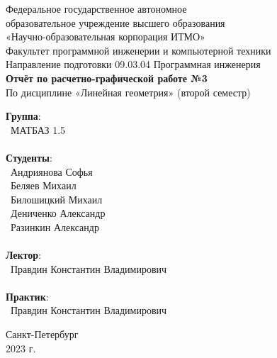 \documentclass{article}
\begin{document}
\thispagestyle{empty}
\begin{center}
        \Large
        Федеральное государственное автономное \\
        образовательное учреждение высшего образования \\ 
        «Научно-образовательная корпорация ИТМО»\\
        \vspace{0.5cm}
        \large
        Факультет программной инженерии и компьютерной техники \\
        Направление подготовки 09.03.04 Программная инженерия \\
        \vspace{1cm}
        \Large
        \textbf{Отчёт по расчетно-графической работе №3} \\
        По дисциплине «Линейная геометрия» (второй семестр)\\
        \large
        \vspace{8cm}
    
        \begin{minipage}{.33\textwidth}
        \end{minipage}
        \hfill
        \begin{minipage}{.4\textwidth}
            \textbf{Группа}: \vspace{.1cm} \\
            \ МАТБАЗ 1.5\\ \\
            \textbf{Студенты}: \vspace{.1cm} \\
            \ Андриянова Софья\\
            \ Беляев Михаил\\
            \ Билошицкий Михаил\\
            \ Дениченко Александр\\
            \ Разинкин Александр\\ \\
            \textbf{Лектор}: \vspace{.1cm} \\
            \ Правдин Константин Владимирович \\ \\
            \textbf{Практик}:  \\
            \ Правдин Константин Владимирович
        \end{minipage}
        \vfill
    Санкт-Петербург\\ 2023 г.
    \end{center}
 
\end{document}
